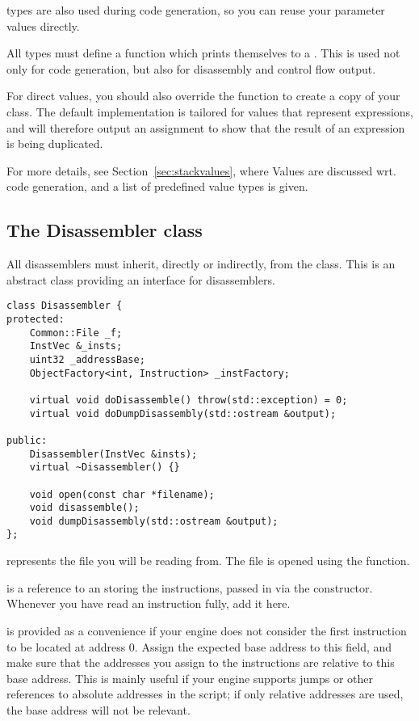  types are also used during code generation, so you can reuse your parameter values directly.

All  types must define a  function which prints themselves to a . This is used not only for code generation, but also for disassembly and control flow output.

For direct values, you should also override the  function to create a copy of your class. The default implementation is tailored for values that represent expressions, and will therefore output an assignment to show that the result of an expression is being duplicated.

For more details, see Section~\vref{sec:stackvalues}, where Values are discussed wrt. code generation, and a list of predefined value types is given.

\subsection{The Disassembler class}
All disassemblers must inherit, directly or indirectly, from the  class. This is an abstract class providing an interface for disassemblers.

\begin{C++}
\begin{lstlisting}
class Disassembler {
protected:
	Common::File _f;
	InstVec &_insts;
	uint32 _addressBase;
	ObjectFactory<int, Instruction> _instFactory;

	virtual void doDisassemble() throw(std::exception) = 0;
	virtual void doDumpDisassembly(std::ostream &output);

public:
	Disassembler(InstVec &insts);
	virtual ~Disassembler() {}

	void open(const char *filename);
	void disassemble();
	void dumpDisassembly(std::ostream &output);
};
\end{lstlisting}
\end{C++}

 represents the file you will be reading from. The file is opened using the  function.

 is a reference to an  storing the instructions, passed in via the constructor. Whenever you have read an instruction fully, add it here.

 is provided as a convenience if your engine does not consider the first instruction to be located at address 0. Assign the expected base address to this field, and make sure that the addresses you assign to the instructions are relative to this base address. This is mainly useful if your engine supports jumps or other references to absolute addresses in the script; if only relative addresses are used, the base address will not be relevant.

